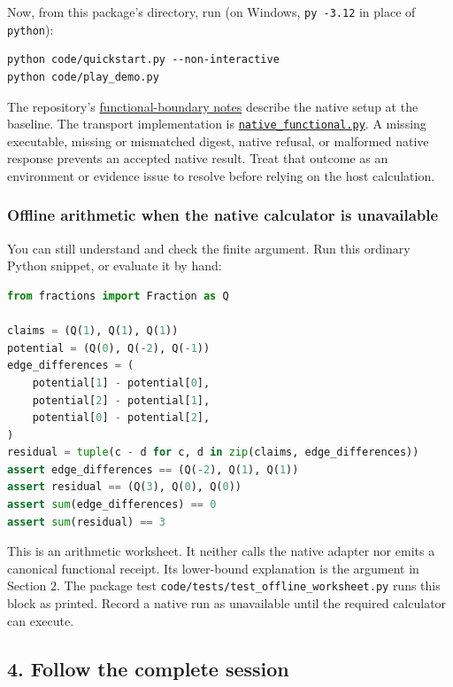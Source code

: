 \documentclass[
  11pt,
]{article}
\newcommand{\passthrough}[1]{#1}
\begin{document}
Now, from this package's directory, run (on Windows,
\passthrough{\lstinline!py -3.12!} in place of
\passthrough{\lstinline!python!}):

\begin{lstlisting}
python code/quickstart.py --non-interactive
python code/play_demo.py
\end{lstlisting}

The repository's
\href{https://github.com/dbccpage/the_symbol_game/blob/52cb5457f6c485ba548cfd292f6012a941ed22cf/omega_engine_education/FUNCTIONAL_BOUNDARY.md}{functional-boundary
notes} describe the native setup at the baseline. The transport
implementation is
\href{code/native_functional.py}{\nolinkurl{native_functional.py}}. A
missing executable, missing or mismatched digest, native refusal, or
malformed native response prevents an accepted native result. Treat that
outcome as an environment or evidence issue to resolve before relying on
the host calculation.

\subsubsection{Offline arithmetic when the native calculator is
unavailable}\label{offline-arithmetic-when-the-native-calculator-is-unavailable}

You can still understand and check the finite argument. Run this
ordinary Python snippet, or evaluate it by hand:

\begin{lstlisting}[language=Python]
from fractions import Fraction as Q

claims = (Q(1), Q(1), Q(1))
potential = (Q(0), Q(-2), Q(-1))
edge_differences = (
    potential[1] - potential[0],
    potential[2] - potential[1],
    potential[0] - potential[2],
)
residual = tuple(c - d for c, d in zip(claims, edge_differences))
assert edge_differences == (Q(-2), Q(1), Q(1))
assert residual == (Q(3), Q(0), Q(0))
assert sum(edge_differences) == 0
assert sum(residual) == 3
\end{lstlisting}

This is an arithmetic worksheet. It neither calls the native adapter nor
emits a canonical functional receipt. Its lower-bound explanation is the
argument in Section 2. The package test
\nolinkurl{code/tests/test_offline_worksheet.py} runs this block as
printed. Record a native run as unavailable until the required
calculator can execute.

\subsection{4. Follow the complete
session}\label{follow-the-complete-session}
\end{document}
